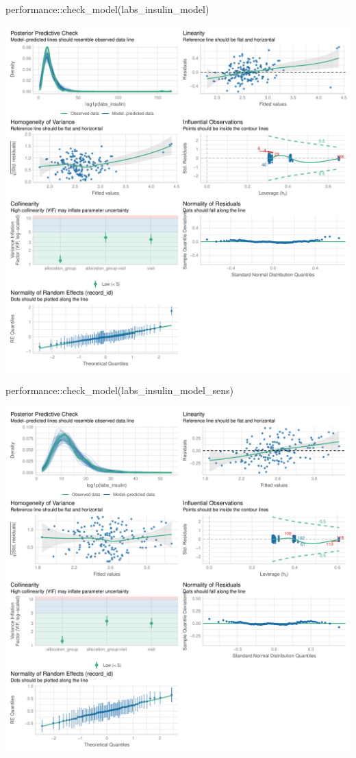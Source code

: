 \documentclass[
  12pt,
]{article}
\newenvironment{Shaded}{\begin{snugshade}}{\end{snugshade}}
\newcommand{\FunctionTok}[1]{\textcolor[rgb]{0.28,0.35,0.67}{#1}}
\newcommand{\NormalTok}[1]{\textcolor[rgb]{0.00,0.23,0.31}{#1}}
\newcommand{\SpecialCharTok}[1]{\textcolor[rgb]{0.37,0.37,0.37}{#1}}
\begin{document}
\begin{Shaded}
\begin{Highlighting}[]
\NormalTok{performance}\SpecialCharTok{::}\FunctionTok{check\_model}\NormalTok{(labs\_insulin\_model)}
\end{Highlighting}
\end{Shaded}

\includegraphics{Outcomes_files/figure-pdf/labs_insulin_4-1.pdf}

\begin{Shaded}
\begin{Highlighting}[]
\NormalTok{performance}\SpecialCharTok{::}\FunctionTok{check\_model}\NormalTok{(labs\_insulin\_model\_sens)}
\end{Highlighting}
\end{Shaded}

\includegraphics{Outcomes_files/figure-pdf/labs_insulin_4-2.pdf}
\end{document}
